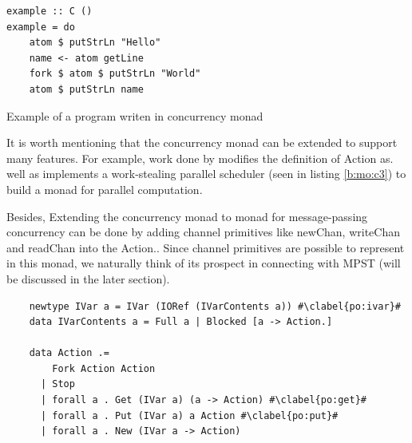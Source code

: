 \begin{code}
\begin{verbatim}
example :: C ()
example = do 
    atom $ putStrLn "Hello" 
    name <- atom getLine 
    fork $ atom $ putStrLn "World"
    atom $ putStrLn name
\end{verbatim}
\caption{Example of a program writen in concurrency monad}
\end{code}

It is worth mentioning that the concurrency monad can be extended to support many features. For example, work done by \cite{marlowMonadDeterministicParallelism} modifies the definition of Action as. well as implements a work-stealing parallel scheduler (seen in listing \ref{b:mo:c3}) to build a monad for parallel computation. 

Besides, Extending the concurrency monad to monad for message-passing concurrency can be done by adding channel primitives like newChan, writeChan and readChan into the Action.. Since channel primitives are possible to represent in this monad, we naturally think of its prospect in connecting with MPST (will be discussed in the later section).
\begin{code}
  \begin{verbatim}
    newtype IVar a = IVar (IORef (IVarContents a)) #\clabel{po:ivar}#
    data IVarContents a = Full a | Blocked [a -> Action.]
    
    data Action .=
        Fork Action Action
      | Stop
      | forall a . Get (IVar a) (a -> Action) #\clabel{po:get}#
      | forall a . Put (IVar a) a Action #\clabel{po:put}#
      | forall a . New (IVar a -> Action)
  \end{verbatim}
  \label{b:mo:c3}
\end{code}

